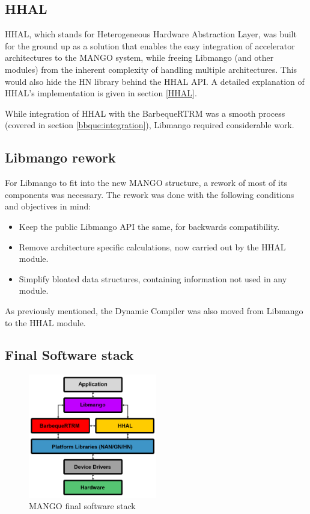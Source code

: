 \subsection{HHAL}

HHAL, which stands for Heterogeneous Hardware Abstraction Layer, was built for the ground up as a solution that enables the easy integration of accelerator architectures to the MANGO system, while freeing Libmango (and other modules) from the inherent complexity of handling multiple architectures. This would also hide the HN library behind the HHAL API.
A detailed explanation of HHAL's implementation is given in section \ref{HHAL}.

While integration of HHAL with the BarbequeRTRM was a smooth process (covered in section \ref{bbque:integration}), Libmango required considerable work.

\subsection{Libmango rework}

For Libmango to fit into the new MANGO structure, a rework of most of its components was necessary. The rework was done with the following conditions and objectives in mind:
\begin{itemize}
    \item Keep the public Libmango API the same, for backwards compatibility.
    \item Remove architecture specific calculations, now carried out by the HHAL module.
    \item Simplify bloated data structures, containing information not used in any module.
\end{itemize}

As previously mentioned, the Dynamic Compiler was also moved from Libmango to the HHAL module.

\subsection{Final Software stack}

\begin{figure}[ht]
    \centering
    \includegraphics[width=0.5\textwidth]{img/mango-final-stack.png}
    \captionsetup{justification=centering}
    \caption{MANGO final software stack}
    \label{fig:mango_final_stack}
\end{figure}

